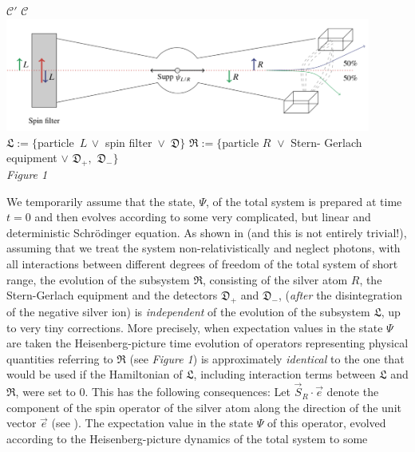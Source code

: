 \documentclass[12pt]{article}
\begin{document}
\begin{center}
 $\mathcal{C'}$ \hspace{5.2cm} $\mathcal{C}$\\
\includegraphics[width=12cm]{Spin-Filter.png}\\
\small{
$ \mathfrak{L}:=\lbrace$particle\, $L\, \vee $ spin filter\, $\vee$\, $\mathfrak{D} \rbrace$ \hspace{0.5cm} $\mathfrak{R}:=\{$particle $R \,\,\vee$ Stern-
Gerlach equipment $\vee  \,\, \mathfrak{D}_{+}, \,\,\mathfrak{D}_{-}\}$
}\\
\vspace{0.2cm}
\textit{Figure 1}
\end{center}
We temporarily assume that the state, $\Psi$, of the total system is prepared at time $t=0$ and 
then evolves according to some very complicated, but linear and deterministic Schr\"odinger equation. 
As shown in \cite{FFS} (and this is not entirely trivial!), assuming that we treat the system non-relativistically 
and neglect photons, with all interactions between different degrees of freedom of the total system of 
short range, the evolution of the subsystem $\mathfrak{R}$, consisting of the silver atom $R$, 
the Stern-Gerlach equipment and  the detectors $\mathfrak{D}_{+}$ and $\mathfrak{D}_{-}$, (\textit{after} the 
disintegration of the negative silver ion) is \textit{independent} of the evolution of the subsystem $\mathfrak{L}$, 
up to very tiny corrections. More precisely, when expectation values in the state $\Psi$ are taken the Heisenberg-picture 
time evolution of operators representing physical quantities referring to $\mathfrak{R}$ 
 (see \textit{Figure 1}) is approximately \textit{identical} to the one that 
would be used if the Hamiltonian of $\mathfrak{L}$, including interaction terms between $\mathfrak{L}$ and $\mathfrak{R}$, 
were set to 0. This has the following consequences: Let $\vec{S}_{R}\cdot \vec{e}$ denote the component of the spin 
operator of the silver atom along the direction of the unit vector $\vec{e}$ (see \cite{FFS}). The expectation value in 
the state $\Psi$ of this operator, evolved according to the Heisenberg-picture dynamics of the total system to some 
\end{document}
